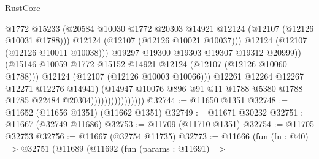 \begin{lexlean}{RustCore}
\begin{coremodule}
                                              @1772
                                              @15233
                                              (@20584
                                                @10030
                                                @1772
                                                @20303
                                                @14921
                                                @12124
                                                (@12107 (@12126 @10031 @1788)))
                                              @12124
                                              (@12107 (@12126 @10021 @10037)))
                                            @12124
                                            (@12107 (@12126 @10011 @10038)))
                                          @19297
                                          @19300
                                          @19303
                                          @19307
                                          @19312
                                          @20999))
                                      (@15146
                                        @10059
                                        @1772
                                        @15152
                                        @14921
                                        @12124
                                        (@12107 (@12126 @10060 @1788)))
                                      @12124
                                      (@12107 (@12126 @10003 @10066)))
                                    @12261
                                    @12264
                                    @12267
                                    @12271
                                    @12276
                                    @14941)
                                  (@14947
                                    @10076
                                    @896
                                    @91
                                    @11
                                    @1788
                                    @5380
                                    @1788
                                    @1785
                                    @22484
                                    @20304))))))))))))))))
@32744 := @11650 @1351
@32748 := @11652 (@11656 @1351) (@11662 @1351)
@32749 := @11671 @30232
@32751 := @11667 (@32749 @11686)
@32753 := @11709 (@11710 @1351)
@32754 := @11705 @32753
@32756 := @11667 (@32754 @11735)
@32773 := @11666
    (fun (fn : @40) =>
    @32751
      (@11689
        (@11692
          (fun (params : @11691) =>

\end{coremodule}
\end{lexlean}
